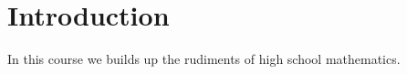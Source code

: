 \section{Introduction} %
\label{sec:introduction}
In this course we builds up the rudiments of high school mathematics.

